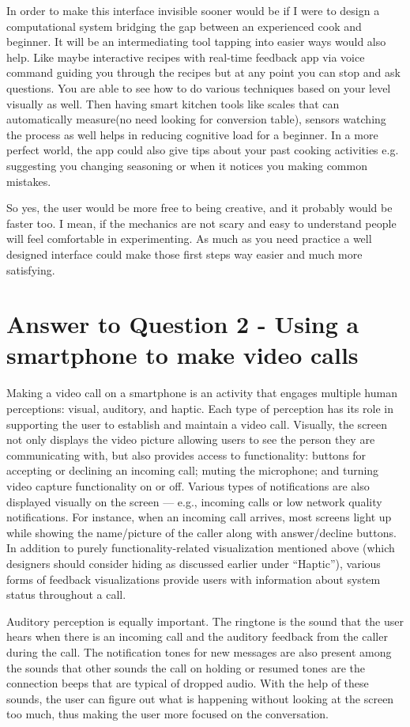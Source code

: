 \documentclass[
	letterpaper, %
]{jdf}
\begin{document}
In order to make this interface invisible sooner would be if I were to design a computational system bridging the gap between an experienced cook and beginner. It will be an intermediating tool tapping into easier ways would also help. Like maybe interactive recipes with real-time feedback app via voice command guiding you through the recipes but at any point you can stop and ask questions. You are able to see how to do various techniques based on your level visually as well. Then having smart kitchen tools like scales that can automatically measure(no need looking for conversion table), sensors watching the process as well helps in reducing cognitive load for a beginner. In a more perfect world, the app could also give tips about your past cooking activities e.g. suggesting you changing seasoning or when it notices you making common mistakes. 

So yes, the user would be more free to being creative, and it probably would be faster too. I mean, if the mechanics are not scary and easy to understand people will feel comfortable in experimenting. As much as you need practice a well designed interface could make those first steps way easier and much more satisfying.
\newpage

\section{Answer to Question 2 - Using a smartphone to make video calls }
Making a video call on a smartphone is an activity that engages multiple human perceptions: visual, auditory, and haptic. Each type of perception has its role in supporting the user to establish and maintain a video call. Visually, the screen not only displays the video picture allowing users to see the person they are communicating with, but also provides access to functionality: buttons for accepting or declining an incoming call; muting the microphone; and turning video capture functionality on or off. Various types of notifications are also displayed visually on the screen — e.g., incoming calls or low network quality notifications. For instance, when an incoming call arrives, most screens light up while showing the name/picture of the caller along with answer/decline buttons. In addition to purely functionality-related visualization mentioned above (which designers should consider hiding as discussed earlier under “Haptic”), various forms of feedback visualizations provide users with information about system status throughout a call.

Auditory perception is equally important. The ringtone is the sound that the user hears when there is an incoming call and the auditory feedback from the caller during the call. The notification tones for new messages are also present among the sounds that other sounds the call on holding or resumed tones are the connection beeps that are typical of dropped audio. With the help of these sounds, the user can figure out what is happening without looking at the screen too much, thus making the user more focused on the conversation.
\end{document}
